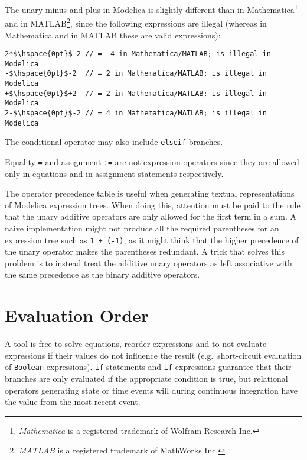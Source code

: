 \begin{example}
The unary minus and plus in Modelica is slightly different than in Mathematica\footnote{\emph{Mathematica} is a registered trademark of Wolfram Research Inc.} and in MATLAB\footnote{\emph{MATLAB} is a registered trademark of MathWorks Inc.}, since the following expressions are illegal (whereas in Mathematica and in MATLAB these are valid expressions):
\begin{lstlisting}[language=modelica]
2*$\hspace{0pt}$-2 // = -4 in Mathematica/MATLAB; is illegal in Modelica
-$\hspace{0pt}$-2  // = 2 in Mathematica/MATLAB; is illegal in Modelica
+$\hspace{0pt}$+2  // = 2 in Mathematica/MATLAB; is illegal in Modelica
2-$\hspace{0pt}$-2 // = 4 in Mathematica/MATLAB; is illegal in Modelica
\end{lstlisting}
\end{example}

The conditional operator may also include \lstinline!elseif!-branches.

Equality \lstinline!=! and assignment \lstinline!:=! are not expression operators since they are allowed only in equations and in assignment statements respectively.

\begin{nonnormative}
The operator precedence table is useful when generating textual representations of Modelica expression trees.
When doing this, attention must be paid to the rule that the unary additive operators are only allowed for the first term in a sum.
A naive implementation might not produce all the required parentheses for an expression tree such as \lstinline!1 + (-1)!, as it might think that the higher precedence of the unary operator makes the parentheses redundant.
A trick that solves this problem is to instead treat the additive unary operators as left associative with the same precedence as the binary additive operators.
\end{nonnormative}


\section{Evaluation Order}\label{evaluation-order}

A tool is free to solve equations, reorder expressions and to not evaluate expressions if their values do not influence the result (e.g.\ short-circuit evaluation of \lstinline!Boolean! expressions).
\lstinline!if!-statements and \lstinline!if!-expressions guarantee that their branches are only evaluated if the appropriate condition is true, but relational operators generating state or time events will during continuous integration have the value from the most recent event.

